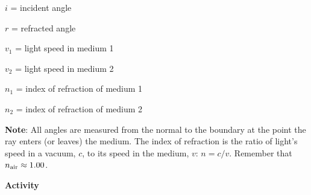 \begin{description}[labelindent=0.2in, nosep]
\item $i$ = incident angle

\item $r$ = refracted angle

\item $v_{1}$ = light speed in medium 1

\item \(v_{2} \) = light speed in medium 2

\item \(n_{1} \) = index of refraction of medium 1 

\item \(n_{2} \) = index of refraction of medium 2
\end{description}

\textbf{Note}: All angles are measured from the normal to the boundary
at the point the ray enters (or leaves) the medium. The index of refraction is
the ratio of light's speed in a vacuum, $c$, to its speed in the medium,
$v$: $n = c / v$. Remember that $n_{\rm air} \approx 1.00$.




\bigskip
\textbf{Activity} 

